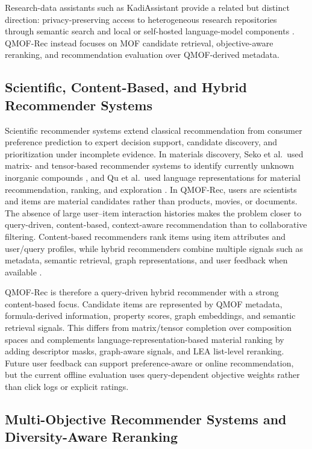 \documentclass[12pt,a4paper]{article}
\begin{document}
Research-data assistants such as KadiAssistant provide a related but distinct direction: privacy-preserving access to heterogeneous research repositories through semantic search and local or self-hosted language-model components \cite{kadiassistant2026}. QMOF-Rec instead focuses on MOF candidate retrieval, objective-aware reranking, and recommendation evaluation over QMOF-derived metadata.

\subsection{Scientific, Content-Based, and Hybrid Recommender Systems}

Scientific recommender systems extend classical recommendation from consumer preference prediction to expert decision support, candidate discovery, and prioritization under incomplete evidence. In materials discovery, Seko et al.\ used matrix- and tensor-based recommender systems to identify currently unknown inorganic compounds \cite{seko2018}, and Qu et al.\ used language representations for material recommendation, ranking, and exploration \cite{qu2023}. In QMOF-Rec, users are scientists and items are material candidates rather than products, movies, or documents. The absence of large user--item interaction histories makes the problem closer to query-driven, content-based, context-aware recommendation than to collaborative filtering. Content-based recommenders rank items using item attributes and user/query profiles, while hybrid recommenders combine multiple signals such as metadata, semantic retrieval, graph representations, and user feedback when available \cite{burke2002,lops2011,ricci2011}.

QMOF-Rec is therefore a query-driven hybrid recommender with a strong content-based focus. Candidate items are represented by QMOF metadata, formula-derived information, property scores, graph embeddings, and semantic retrieval signals. This differs from matrix/tensor completion over composition spaces \cite{seko2018} and complements language-representation-based material ranking \cite{qu2023} by adding descriptor masks, graph-aware signals, and LEA list-level reranking. Future user feedback can support preference-aware or online recommendation, but the current offline evaluation uses query-dependent objective weights rather than click logs or explicit ratings.

\subsection{Multi-Objective Recommender Systems and Diversity-Aware Reranking}
\end{document}
